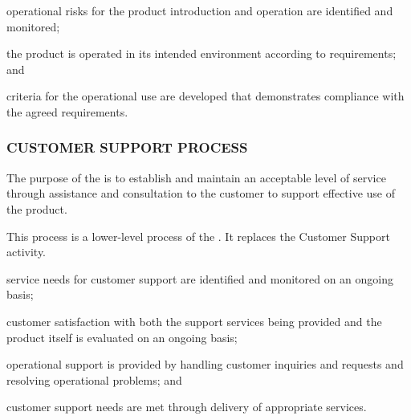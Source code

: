 			\begin{adjustwidth}{2em}{0pt} 

				\begin{compactitem}

					\item operational risks for the product introduction and operation are identified and monitored;

					\item the product is operated in its intended environment according to requirements; and

					\item criteria for the operational use are developed that demonstrates compliance with the agreed requirements.

				\end{compactitem}

			\end{adjustwidth}

		\subsubsection{CUSTOMER SUPPORT PROCESS\label{llproc:customer_support_process}}

			\begin{adjustwidth}{2em}{0pt} 

				The purpose of the  is to establish and maintain an acceptable level of service through assistance and consultation to the customer to support effective use of the product.

				This process is a lower-level process of the . It replaces the Customer Support activity.

			\end{adjustwidth}

			\begin{adjustwidth}{2em}{0pt} 

				\begin{compactitem}

					\item service needs for customer support are identified and monitored on an ongoing basis;

					\item customer satisfaction with both the support services being provided and the product itself is evaluated on an ongoing basis;

					\item operational support is provided by handling customer inquiries and requests and resolving operational problems; and

					\item customer support needs are met through delivery of appropriate services.

				\end{compactitem}

			\end{adjustwidth}

